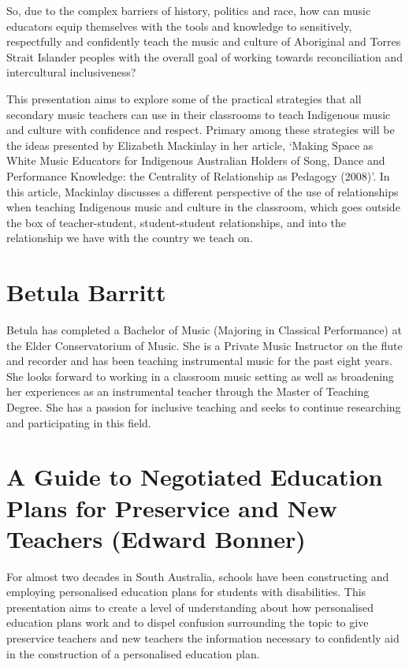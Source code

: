 \documentclass[twoside,12pt,a4paper,notitlepage]{memoir}
\begin{document}
So, due to the complex barriers of history, politics and race, how can music educators equip themselves with the tools and knowledge to sensitively, respectfully and confidently teach the music and culture of Aboriginal and Torres Strait Islander peoples with the overall goal of working towards reconciliation and intercultural inclusiveness?


This presentation aims to explore some of the practical strategies that all secondary music teachers can use in their classrooms to teach Indigenous music and culture with confidence and respect. Primary among these strategies will be the ideas presented by Elizabeth Mackinlay in her article, ‘Making Space as White Music Educators for Indigenous Australian Holders of Song, Dance and Performance Knowledge: the Centrality of Relationship as Pedagogy (2008)’. In this article, Mackinlay discusses a different perspective of the use of relationships when teaching Indigenous music and culture in the classroom, which goes outside the box of teacher-student, student-student relationships, and into the relationship we have with the country we teach on.


\section*{Betula Barritt}

Betula has completed a Bachelor of Music (Majoring in Classical Performance) at the Elder Conservatorium of Music. She is a Private Music Instructor on the flute and recorder and has been teaching instrumental music for the past eight years. She looks forward to working in a classroom music setting as well as broadening her experiences as an instrumental teacher through the Master of Teaching Degree. She has a passion for inclusive teaching and seeks to continue researching and participating in this field.



\pagebreak
\section*{A Guide to Negotiated Education Plans for Preservice and New Teachers (Edward Bonner)}
\label{aut:bonner}

For almost two decades in South Australia, schools have been constructing and employing personalised education plans for students with disabilities. This presentation aims to create a level of understanding about how personalised education plans work and to dispel confusion surrounding the topic to give preservice teachers and new teachers the information necessary to confidently aid in the construction of a personalised education plan. 
\end{document}
